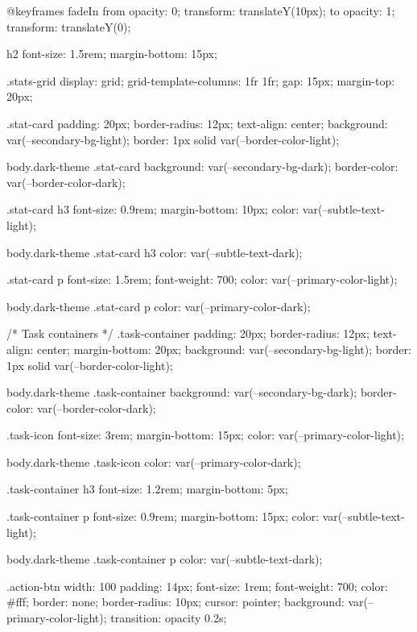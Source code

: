   @keyframes fadeIn {
    from {
      opacity: 0;
      transform: translateY(10px);
    }
    to {
      opacity: 1;
      transform: translateY(0);
    }
  }
  
  h2 {
    font-size: 1.5rem;
    margin-bottom: 15px;
  }
  
  .stats-grid {
    display: grid;
    grid-template-columns: 1fr 1fr;
    gap: 15px;
    margin-top: 20px;
  }
  
  .stat-card {
    padding: 20px;
    border-radius: 12px;
    text-align: center;
    background: var(--secondary-bg-light);
    border: 1px solid var(--border-color-light);
  }
  
  body.dark-theme .stat-card {
    background: var(--secondary-bg-dark);
    border-color: var(--border-color-dark);
  }
  
  .stat-card h3 {
    font-size: 0.9rem;
    margin-bottom: 10px;
    color: var(--subtle-text-light);
  }
  
  body.dark-theme .stat-card h3 {
    color: var(--subtle-text-dark);
  }
  
  .stat-card p {
    font-size: 1.5rem;
    font-weight: 700;
    color: var(--primary-color-light);
  }
  
  body.dark-theme .stat-card p {
    color: var(--primary-color-dark);
  }
  
  /* Task containers */
  .task-container {
    padding: 20px;
    border-radius: 12px;
    text-align: center;
    margin-bottom: 20px;
    background: var(--secondary-bg-light);
    border: 1px solid var(--border-color-light);
  }
  
  body.dark-theme .task-container {
    background: var(--secondary-bg-dark);
    border-color: var(--border-color-dark);
  }
  
  .task-icon {
    font-size: 3rem;
    margin-bottom: 15px;
    color: var(--primary-color-light);
  }
  
  body.dark-theme .task-icon {
    color: var(--primary-color-dark);
  }
  
  .task-container h3 {
    font-size: 1.2rem;
    margin-bottom: 5px;
  }
  
  .task-container p {
    font-size: 0.9rem;
    margin-bottom: 15px;
    color: var(--subtle-text-light);
  }
  
  body.dark-theme .task-container p {
    color: var(--subtle-text-dark);
  }
  
  .action-btn {
    width: 100%
    padding: 14px;
    font-size: 1rem;
    font-weight: 700;
    color: #fff;
    border: none;
    border-radius: 10px;
    cursor: pointer;
    background: var(--primary-color-light);
    transition: opacity 0.2s;
  }
  
